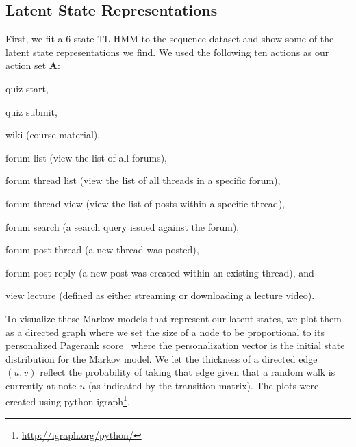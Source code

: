 \subsection{Latent State Representations}
First, we fit a 6-state TL-HMM to the \textretrieval{} sequence dataset and
show some of the latent state representations we find. We used the
following ten actions as our action set $\mathbf{A}$:
\begin{enumerate*}[label=(\arabic*)]
  \item quiz start,
  \item quiz submit,
  \item wiki (course material),
  \item forum list (view the list of all forums),
  \item forum thread list (view the list of all threads in a specific
    forum),
  \item forum thread view (view the list of posts within a specific
    thread),
  \item forum search (a search query issued against the forum),
  \item forum post thread (a new thread was posted),
  \item forum post reply (a new post was created within an existing
    thread), and
  \item view lecture (defined as either streaming or downloading a lecture
    video).
\end{enumerate*}

To visualize these Markov models that represent our latent states, we plot
them as a directed graph where we set the size of a node to be proportional
to its personalized Pagerank score~\cite{Page:1999:PageRank, Jeh:2003:WWW}
where the personalization vector is the initial state distribution for the
Markov model. We let the thickness of a directed edge $(u, v)$ reflect the
probability of taking that edge given that a random walk is currently at
note $u$ (as indicated by the transition matrix). The plots were created
using python-igraph\footnote{\url{http://igraph.org/python/}}.

